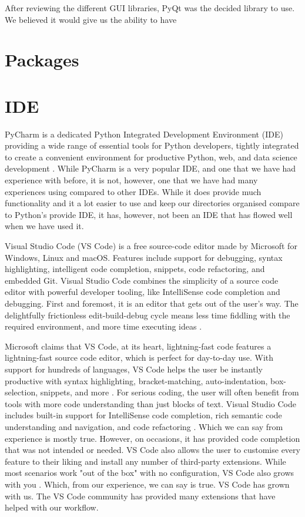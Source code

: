 	After reviewing the different GUI libraries, PyQt was the decided library to use. We believed it would give us the ability to have 
	
	
	\section{Packages}
	\label{sec:packages_used}
	
	
	\section{IDE}
	\label{sec:ide_used}
	
	PyCharm is a dedicated Python Integrated Development Environment (IDE) providing a wide range of essential tools for Python developers, tightly integrated to create a convenient environment for productive Python, web, and data science development \cite{pycharm_get_started}. While PyCharm is a very popular IDE, and one that we have had experience with before, it is not, however, one that we have had many experiences using compared to other IDEs. While it does provide much functionality and it a lot easier to use and keep our directories organised compare to Python's provide IDE, it has, however, not been an IDE that has flowed well when we have used it.
	
	Visual Studio Code (VS Code) is a free source-code editor made by Microsoft for Windows, Linux and macOS. Features include support for debugging, syntax highlighting, intelligent code completion, snippets, code refactoring, and embedded Git. Visual Studio Code combines the simplicity of a source code editor with powerful developer tooling, like IntelliSense code completion and debugging. First and foremost, it is an editor that gets out of the user's way. The delightfully frictionless edit-build-debug cycle means less time fiddling with the required environment, and more time executing ideas \cite{vs_code}.
	
	Microsoft claims that VS Code, at its heart, lightning-fast code features a lightning-fast source code editor, which is perfect for day-to-day use. With support for hundreds of languages, VS Code helps the user be instantly productive with syntax highlighting, bracket-matching, auto-indentation, box-selection, snippets, and more \cite{vs_code}. For serious coding, the user will often benefit from tools with more code understanding than just blocks of text. Visual Studio Code includes built-in support for IntelliSense code completion, rich semantic code understanding and navigation, and code refactoring \cite{vs_code}. Which we can say from experience is mostly true. However, on occasions, it has provided code completion that was not intended or needed. VS Code also allows the user to customise every feature to their liking and install any number of third-party extensions. While most scenarios work "out of the box" with no configuration, VS Code also grows with you \cite{vs_code}. Which, from our experience, we can say is true. VS Code has grown with us. The VS Code community has provided many extensions that have helped with our workflow. 
	
